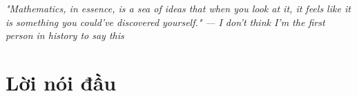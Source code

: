 \documentclass[11pt]{book}
\begin{document}
    

    \thispagestyle{empty}

    \frontmatter

    \clearpage
    \begin{center}
        \thispagestyle{empty}
        \vspace*{\fill}
        \emph{"Mathematics, in essence, is a sea of ideas that when you look at it, it feels like it is something you could've discovered yourself."}
        \emph{--- I don't think I'm the first person in history to say this}
        \vspace*{\fill}
    \end{center}
    \clearpage

    \thispagestyle{empty}
    
    \chapter*{Lời nói đầu}
    \newpage

    \tableofcontents
    \thispagestyle{empty}

    \newpage

    \mainmatter

    
\end{document}
